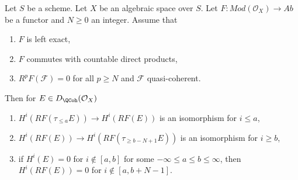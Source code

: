 \begin{lemma}
\label{lemma-application-nice-K-injective}
Let $S$ be a scheme. Let $X$ be an algebraic space over $S$.
Let $F : \textit{Mod}(\mathcal{O}_X) \to \textit{Ab}$
be a functor and $N \geq 0$ an integer. Assume that
\begin{enumerate}
\item $F$ is left exact,
\item $F$ commutes with countable direct products,
\item $R^pF(\mathcal{F}) = 0$ for all $p \geq N$ and $\mathcal{F}$
quasi-coherent.
\end{enumerate}
Then for $E \in D_\QCoh(\mathcal{O}_X)$
\begin{enumerate}
\item $H^i(RF(\tau_{\leq a}E)) \to H^i(RF(E))$ is an isomorphism
for $i \leq a$,
\item $H^i(RF(E)) \to H^i(RF(\tau_{\geq b - N + 1}E))$ is an isomorphism
for $i \geq b$,
\item if $H^i(E) = 0$ for $i \not \in [a, b]$ for some
$-\infty \leq a \leq b \leq \infty$, then $H^i(RF(E)) = 0$
for $i \not \in [a, b + N - 1]$.
\end{enumerate}
\end{lemma}

